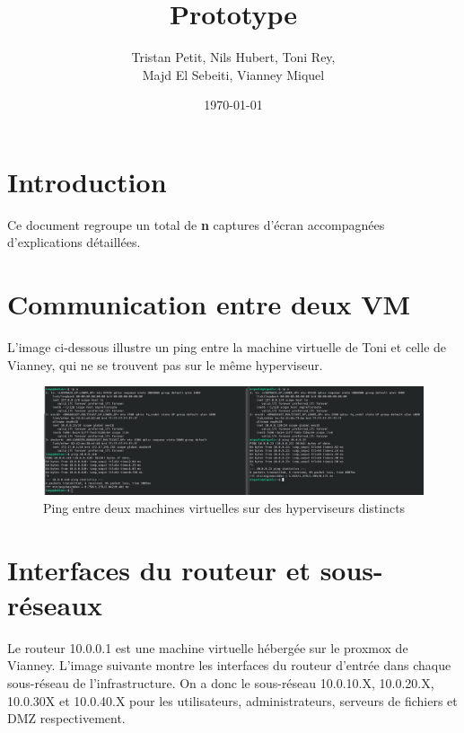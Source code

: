 \documentclass{article}
\begin{document}
\title{Prototype }
\author{Tristan Petit, Nils Hubert, Toni Rey, \\ Majd El Sebeiti, Vianney Miquel}
\date{\today}

\maketitle

\section{Introduction}

Ce document regroupe un total de \textbf{n} captures d'écran accompagnées d'explications détaillées.

\section{Communication entre deux VM}

L'image ci-dessous illustre un ping entre la machine virtuelle de Toni et celle de Vianney, qui ne se trouvent pas sur le même hyperviseur.

\begin{figure}[h]
    \centering
    \includegraphics[width=1\textwidth]{Ping.png}
    \caption{Ping entre deux machines virtuelles sur des hyperviseurs distincts}
\end{figure}

\section{Interfaces du routeur et sous-réseaux}

Le routeur 10.0.0.1 est une machine virtuelle hébergée sur le proxmox de Vianney.
L'image suivante montre les interfaces du routeur d'entrée dans chaque sous-réseau de l'infrastructure. On a donc le sous-réseau 10.0.10.X, 10.0.20.X, 10.0.30X et 10.0.40.X pour les utilisateurs, administrateurs, serveurs de fichiers et DMZ respectivement.
\end{document}
